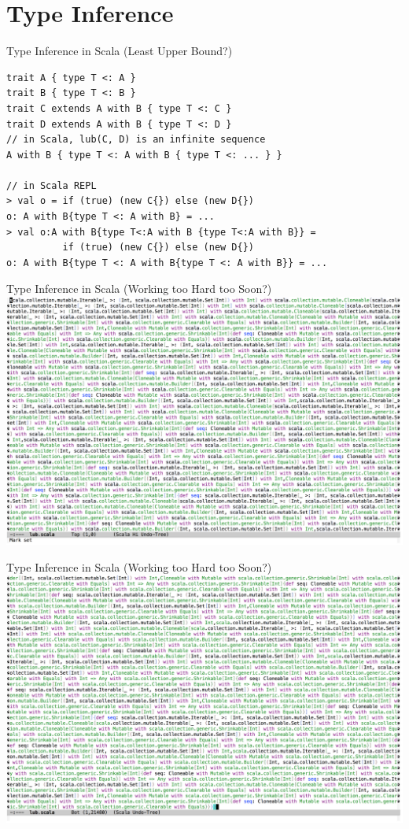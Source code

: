 \documentclass{beamer}
\begin{document}
\section{Type Inference}

\begin{frame}[fragile]{Type Inference in Scala (Least Upper Bound?)}
\begin{verbatim}
trait A { type T <: A }
trait B { type T <: B }
trait C extends A with B { type T <: C }
trait D extends A with B { type T <: D }
// in Scala, lub(C, D) is an infinite sequence
A with B { type T <: A with B { type T <: ... } }

// in Scala REPL
> val o = if (true) (new C{}) else (new D{})
o: A with B{type T <: A with B} = ...
> val o:A with B{type T<:A with B {type T<:A with B}} =
          if (true) (new C{}) else (new D{})
o: A with B{type T <: A with B{type T <: A with B}} = ...
\end{verbatim}
\end{frame}

\begin{frame}[fragile]{Type Inference in Scala (Working too Hard too Soon?)}
\includegraphics[width=\textwidth]{lub1.png}
\end{frame}

\begin{frame}[fragile]{Type Inference in Scala (Working too Hard too Soon?)}
\includegraphics[width=\textwidth]{lub2.png}
\end{frame}
\end{document}

